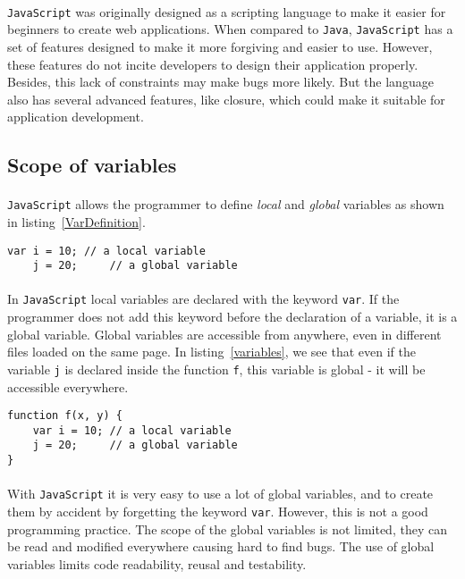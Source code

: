 \paragraph{} 
\texttt{JavaScript} was originally designed as a scripting language to make it easier for beginners to create web applications. When compared to \texttt{Java}, \texttt{JavaScript} has a set of features designed to make it more forgiving and easier to use. However, these features do not incite developers to design their application properly. Besides, this lack of constraints may make bugs more likely. But the language also has several advanced features, like closure, which could make it suitable for application development.

\subsection{Scope of variables}

\paragraph{}
\texttt{JavaScript} allows the programmer to define \emph{local} and \emph{global} variables as shown in listing~\ref{VarDefinition}.
\begin{lstlisting}[caption={Defining variables}, label={VarDefinition}]
    var i = 10; // a local variable
    j = 20;     // a global variable
\end{lstlisting}

\paragraph{}
In \texttt{JavaScript} local variables are declared with the keyword \texttt{var}. If the programmer does not add this keyword before the declaration of a variable, it is a global variable. Global variables are accessible from anywhere, even in different files loaded on the same page. In listing~\ref{variables}, we see that even if the variable \texttt{j} is declared inside the function \texttt{f}, this variable is global - it will be accessible everywhere.  
\begin{lstlisting}[caption={Global and local variables}, label={variables}]
function f(x, y) {
    var i = 10; // a local variable
    j = 20;     // a global variable
}
\end{lstlisting}

\paragraph{}
With \texttt{JavaScript} it is very easy to use a lot of global variables, and to create them by accident by forgetting the keyword \texttt{var}. However, this is not a good programming practice. The scope of the global variables is not limited, they can be read and modified everywhere causing hard to find bugs. The use of global variables limits code readability, reusal and testability.

